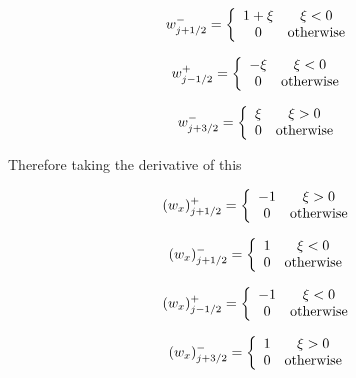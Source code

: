 \documentclass[12pt]{article}
\begin{document}
\begin{equation}
w^-_{j+1/2} = \left\lbrace \begin{array}{c c}
1+\xi & \xi < 0 \\
0 & \text{otherwise}
\end{array} 
\right.
\end{equation}

\begin{equation}
w^+_{j-1/2} = \left\lbrace \begin{array}{c c}
-\xi & \xi < 0 \\
0 & \text{otherwise}
\end{array} 
\right.
\end{equation}

\begin{equation}
w^-_{j+3/2} = \left\lbrace \begin{array}{c c}
\xi & \xi > 0 \\
0 & \text{otherwise}
\end{array} 
\right.
\end{equation}

Therefore taking the derivative of this

\begin{equation}
(w_{x})^+_{j+1/2} = \left\lbrace \begin{array}{c c}
-1 & \xi > 0 \\
0 & \text{otherwise}
\end{array} 
\right.
\end{equation}

\begin{equation}
(w_{x})^-_{j+1/2} = \left\lbrace \begin{array}{c c}
1 & \xi < 0 \\
0 & \text{otherwise}
\end{array} 
\right.
\end{equation}

\begin{equation}
(w_{x})^+_{j-1/2} = \left\lbrace \begin{array}{c c}
-1 & \xi < 0 \\
0 & \text{otherwise}
\end{array} 
\right.
\end{equation}

\begin{equation}
(w_{x})^-_{j+3/2} = \left\lbrace \begin{array}{c c}
1 & \xi > 0 \\
0 & \text{otherwise}
\end{array} 
\right.
\end{equation}
\end{document}
